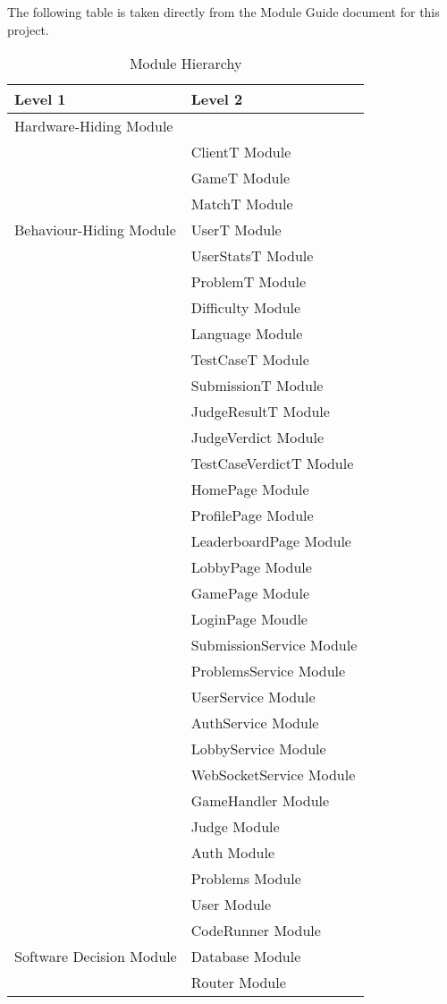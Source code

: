 \documentclass[12pt, titlepage]{article}
\begin{document}
The following table is taken directly from the Module Guide document for this project.

\begin{table}[H]
\centering
\begin{tabular}{p{} p{}}
\toprule
\textbf{Level 1} & \textbf{Level 2}\\
\midrule

{Hardware-Hiding Module} & \\
\midrule

\multirow{7}{0.3\textwidth}{Behaviour-Hiding Module} 
& ClientT Module\\
& GameT Module\\
& MatchT Module\\
& UserT Module\\
& UserStatsT Module\\
& ProblemT Module\\ 
& Difficulty Module\\
& Language Module\\
& TestCaseT Module\\
& SubmissionT Module\\
& JudgeResultT Module\\
& JudgeVerdict Module\\
& TestCaseVerdictT Module\\
& HomePage Module\\
& ProfilePage Module\\
& LeaderboardPage Module\\
& LobbyPage Module\\
& GamePage Module\\
& LoginPage Moudle\\
& SubmissionService Module\\
& ProblemsService Module\\
& UserService Module\\
& AuthService Module\\
& LobbyService Module\\
& WebSocketService Module\\
& GameHandler Module\\
& Judge Module\\
& Auth Module\\
& Problems Module\\
& User Module\\
\midrule

\multirow{3}{0.3\textwidth}{Software Decision Module} & {CodeRunner Module}\\
& Database Module\\
& Router Module\\
\bottomrule

\end{tabular}
\caption{Module Hierarchy}
\label{TblMH}
\end{table}
\end{document}
